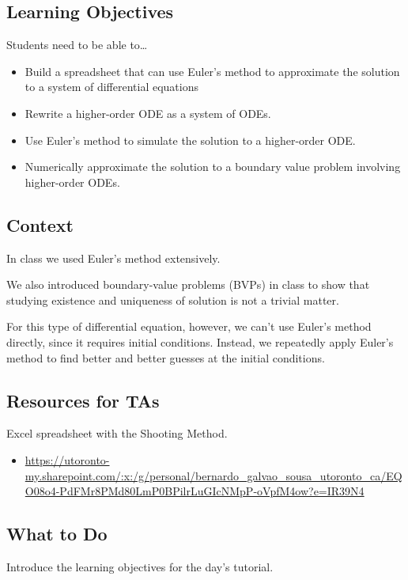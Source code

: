 \subsection*{Learning Objectives}
Students need to be able to\ldots
\begin{itemize}
	\item Build a spreadsheet that can use Euler's method to approximate the solution to a system of differential equations
	\item Rewrite a higher-order ODE as a system of ODEs.
	\item Use Euler's method to simulate the solution to a higher-order ODE.
	\item Numerically approximate the solution to a boundary value problem involving higher-order ODEs.
\end{itemize}

\subsection*{Context}

In class we used Euler's method extensively.

We also introduced boundary-value problems (BVPs) in class to show that studying existence 
and uniqueness of solution is not a trivial matter.

For this type of differential equation, however, we can't use Euler's method directly, since it requires initial conditions.
Instead, we repeatedly apply Euler's method to find better and better guesses at the initial conditions.


\subsection*{Resources for TAs}

Excel spreadsheet with the Shooting Method.

\begin{itemize}
	\item \url{https://utoronto-my.sharepoint.com/:x:/g/personal/bernardo_galvao_sousa_utoronto_ca/EQO08o4-PdFMr8PMd80LmP0BPilrLuGIcNMpP-oVpfM4ow?e=IR39N4}
\end{itemize}




\subsection*{What to Do}
Introduce the learning objectives for the day's tutorial.

